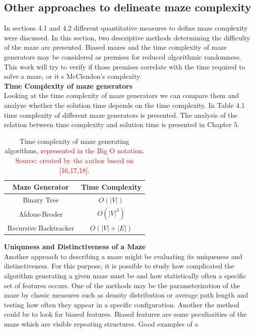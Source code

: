 \subsection{Other approaches to delineate maze complexity }
In sections 4.1 and 4.2 different quantitative measures to define maze complexity were discussed. In this section, two descriptive methods determining the difficulty of the maze are presented. Biased mazes and the time complexity of maze generators may be considered as premises for reduced algorithmic randomness. This work will try to verify if those premises correlate with the time required to solve a maze, or it s McClendon’s complexity.\\ \newline
\textbf{Time Complexity of maze generators}\\
Looking at the time complexity of maze generators we can compare them and analyze whether the solution time depends on the time complexity. In Table 4.1 time complexity of different maze generators is presented. The analysis of the relation between time complexity and solution time is presented in Chapter 5.\\
\begin{table}[!ht]
\centering
\begin{tabular}{ |c||c| } 
\hline 
Maze Generator& Time Complexity\\ \hline
Binary Tree\cite{16} & $O(|V|)$\\
Aldous-Broder\cite{17}& $O(|V|^3)$\\ 
Recursive Backtracker\cite{18}& $O(|V|+|E|)$\\ 
\hline
 \end{tabular} 
\caption{Time complexity of maze generating algorithms, \textcolor{red}{represented in the Big O notation.\\Source: created by the author based on [16,17,18].}} 
 \end{table}
\newpage
\textbf{Uniquness and Distinctiveness of a Maze}\\
Another approach to describing a maze might be evaluating its uniqueness and distinctiveness. For this purpose, it is possible to study how complicated the
algorithm generating a given maze must be and how statistically often a specific set of features occurs. One of the methods may be the parameterization of
the maze by classic measures such as density distribution or average path length and testing how often they appear in a specific configuration. Another
the method could be to look for biased features. Biased features are some peculiarities of the maze which are visible repeating structures. Good examples of a
